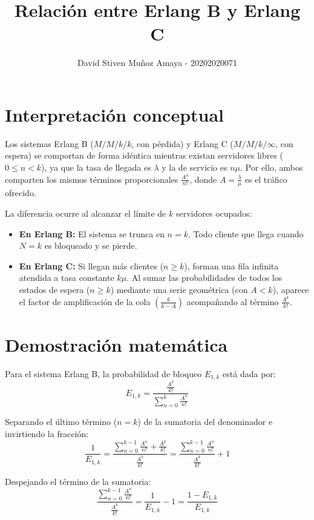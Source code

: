 \documentclass[11pt, a4paper]{article}
\title{\textbf{Relación entre Erlang B y Erlang C}}
\author{David Stiven Muñoz Amaya - 20202020071}
\date{}
\begin{document}
\maketitle

\section{Interpretación conceptual}

Los sistemas Erlang B ($M/M/k/k$, con pérdida) y Erlang C ($M/M/k/\infty$, con espera) se comportan de forma idéntica mientras existan servidores libres ($0 \le n < k$), ya que la tasa de llegada es $\lambda$ y la de servicio es $n\mu$. Por ello, ambos comparten los mismos términos proporcionales $\frac{A^n}{n!}$, donde $A = \frac{\lambda}{\mu}$ es el tráfico ofrecido.

La diferencia ocurre al alcanzar el límite de $k$ servidores ocupados:
\begin{itemize}
    \item \textbf{En Erlang B:} El sistema se trunca en $n = k$. Todo cliente que llega cuando $N = k$ es bloqueado y se pierde.
    \item \textbf{En Erlang C:} Si llegan más clientes ($n \ge k$), forman una fila infinita atendida a tasa constante $k\mu$. Al sumar las probabilidades de todos los estados de espera ($n \ge k$) mediante una serie geométrica (con $A < k$), aparece el factor de amplificación de la cola $\left(\frac{k}{k - A}\right)$ acompañando al término $\frac{A^k}{k!}$.
\end{itemize}

\section{Demostración matemática}

Para el sistema Erlang B, la probabilidad de bloqueo $E_{1,k}$ está dada por:
\[
E_{1,k} = \frac{\frac{A^k}{k!}}{\sum\limits_{n=0}^{k} \frac{A^n}{n!}}
\]

Separando el último término ($n = k$) de la sumatoria del denominador e invirtiendo la fracción:
\[
\frac{1}{E_{1,k}} = \frac{\sum\limits_{n=0}^{k-1} \frac{A^n}{n!} + \frac{A^k}{k!}}{\frac{A^k}{k!}} = \frac{\sum\limits_{n=0}^{k-1} \frac{A^n}{n!}}{\frac{A^k}{k!}} + 1
\]

Despejando el término de la sumatoria:
\begin{equation}
\frac{\sum\limits_{n=0}^{k-1} \frac{A^n}{n!}}{\frac{A^k}{k!}} = \frac{1}{E_{1,k}} - 1 = \frac{1 - E_{1,k}}{E_{1,k}}
\end{equation}
\end{document}
